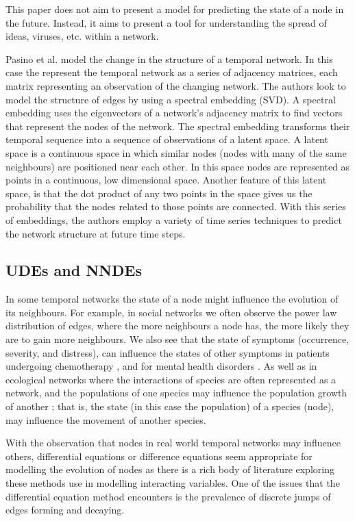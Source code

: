 \documentclass[12pt]{amsart}
\begin{document}
    This paper does not aim to present a model for predicting the state of a node in the future. Instead, it aims to present a tool for understanding the spread of ideas, viruses, etc. within a network.


    Pasino et al.\cite{sanna2021link} model the change in the structure of a temporal network. In this case the  represent the temporal network as a series of adjacency matrices, each matrix representing an observation of the changing network. The authors look to model the structure of edges by using a spectral embedding (SVD). A spectral embedding uses the eigenvectors of a network's adjacency matrix to find vectors that represent the nodes of the network. The spectral embedding transforms their temporal sequence into a sequence of observations of a latent space. A latent space is a continuous space in which similar nodes (nodes with many of the same neighbours) are positioned near each other. In this space nodes are represented as points in a continuous, low dimensional space. Another feature of this latent space, is that the dot product of any two points in the space gives us the probability that the nodes related to those points are connected.  With this series of embeddings, the authors employ a variety of time series techniques to predict the network structure at future time steps.

\subsection{UDEs and NNDEs}
    In some temporal networks the state of a node might influence the evolution of its neighbours. For example, in social networks we often observe the power law distribution of edges, where the more neighbours a node has, the more likely they are to gain more neighbours\cite{zhao2012multi,garg2009evolution}. We also see that the state of symptoms (occurrence, severity, and distress), can influence the states of other symptoms in patients undergoing chemotherapy \cite{papachristou2019network,kalantari2022network}, and for mental health disorders \cite{contreras2020temporal}. As well as in ecological networks where the interactions of species are often represented as a network, and the populations of one species may influence the population growth of another \cite{elton2001animal,volterra1927variazioni}; that is, the state (in this case the population) of a species (node), may influence the movement of another species.
            
    With the observation that nodes in real world temporal networks may influence others, differential equations or difference equations seem appropriate for modelling the evolution of nodes as there is a rich body of literature exploring these methods use in modelling interacting variables. One of the issues that the differential equation method encounters is the prevalence of discrete jumps of edges forming and decaying.  
 
\end{document}
